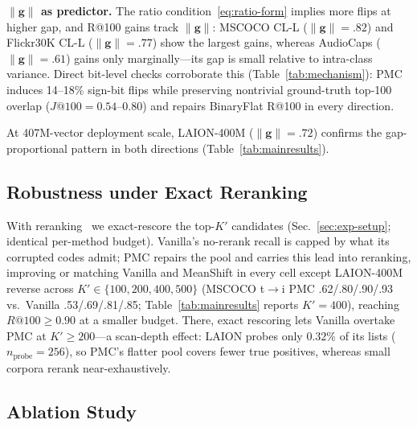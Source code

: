 \textbf{{\boldmath$\|\mathbf{g}\|$} as predictor.}
The ratio condition~\eqref{eq:ratio-form} implies more flips at higher gap, and R@100 gains track $\|\mathbf{g}\|$: MSCOCO CL-L ($\|\mathbf{g}\|{=}.82$) and Flickr30K CL-L ($\|\mathbf{g}\|{=}.77$) show the largest gains, whereas AudioCaps ($\|\mathbf{g}\|{=}.61$) gains only marginally---its gap is small relative to intra-class variance. Direct bit-level checks corroborate this (Table~\ref{tab:mechanism}): PMC induces 14--18\% sign-bit flips while preserving nontrivial ground-truth top-100 overlap ($J@100{=}0.54$--$0.80$) and repairs BinaryFlat R@100 in every direction.

At 407M-vector deployment scale, LAION-400M ($\|\mathbf{g}\|{=}.72$) confirms the gap-proportional pattern in both directions (Table~\ref{tab:mainresults}).

\subsection{Robustness under Exact Reranking}\label{sec:rerank}

With reranking~\cite{wang2011cascade} we exact-rescore the top-$K'$ candidates (Sec.~\ref{sec:exp-setup}; identical per-method budget). Vanilla's no-rerank recall is capped by what its corrupted codes admit; PMC repairs the pool and carries this lead into reranking, improving or matching Vanilla and MeanShift in every cell except LAION-400M reverse across $K'\in\{100,200,400,500\}$ (MSCOCO t$\to$i PMC .62/.80/.90/.93 vs.\ Vanilla .53/.69/.81/.85; Table~\ref{tab:mainresults} reports $K'{=}400$), reaching $R@100{\geq}0.90$ at a smaller budget. There, exact rescoring lets Vanilla overtake PMC at $K'{\geq}200$---a scan-depth effect: LAION probes only $0.32\%$ of its lists ($n_\mathrm{probe}{=}256$), so PMC's flatter pool covers fewer true positives, whereas small corpora rerank near-exhaustively.

\subsection{Ablation Study}\label{sec:ablation}

